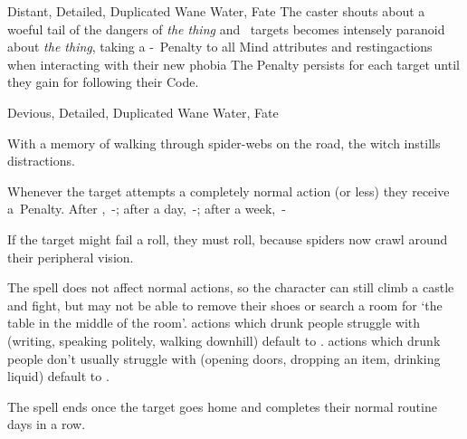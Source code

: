 \ifodd\value{diceNo}

  {Distant, Detailed, Duplicated}%
  {Wane}%
  {Water, Fate}%
  {}%
  {The caster shouts about a woeful tail of the dangers of \emph{the thing} and ~targets becomes intensely paranoid about \emph{the thing}, taking a -~Penalty to all Mind \glspl{attribute} and \glspl{restingaction} when interacting with their new phobia}%
  {
    The Penalty persists for each target until they gain  for following their Code.
  }

\else

  {Devious, Detailed, Duplicated}%
  {Wane}%
  {Water, Fate}%
  {}%
  {With a memory of walking through spider-webs on the road, the \gls{witch} instills distractions.
  \addtocounter{track}{-2}%
  \addtocounter{gold}{-1}%
  Whenever the target attempts a completely normal action (\tn[2] or less) they receive a~Penalty.
  After ,~-; after a day,~-; after a week,~-}%
  {%
  	If the target might fail a roll, they must roll, because spiders now crawl around their peripheral vision.

	The \gls{spell} does not affect normal \glspl{action}, so the character can still climb a castle and fight, but may not be able to remove their shoes or search a room for `the table in the middle of the room'.
	\Glspl{action} which drunk people struggle with (writing, speaking politely, walking downhill) default to \tn[2].
	\Glspl{action} which drunk people don't usually struggle with (opening doors, dropping an item, drinking liquid) default to \tn[0].

	The \gls{spell} ends once the target goes home and completes their normal routine  days in a row.
  }

\fi
{}
